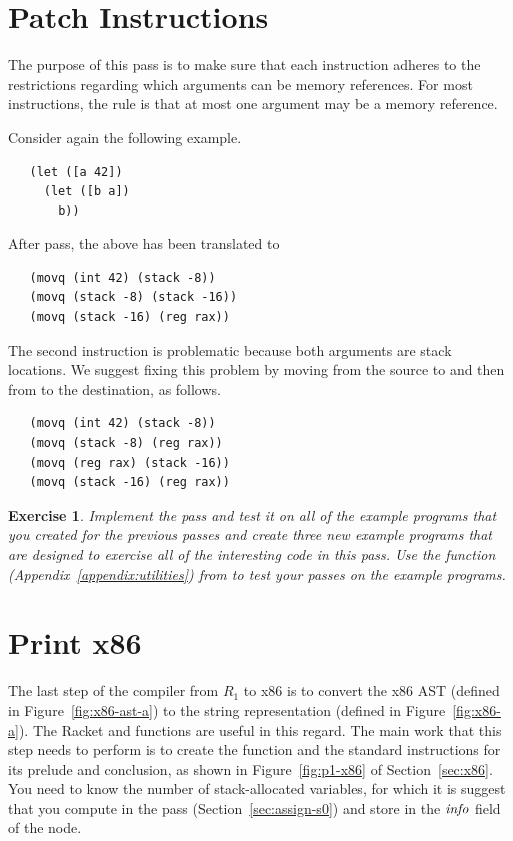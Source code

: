 \documentclass[11pt]{book}
\newtheorem{exercise}[theorem]{Exercise}
\begin{document}
\section{Patch Instructions}
\label{sec:patch-s0}

The purpose of this pass is to make sure that each instruction adheres
to the restrictions regarding which arguments can be memory
references. For most instructions, the rule is that at most one
argument may be a memory reference.

Consider again the following example.
\begin{lstlisting}
   (let ([a 42])
     (let ([b a])
       b))
\end{lstlisting}
After  pass, the above has been translated to
\begin{lstlisting}
   (movq (int 42) (stack -8))
   (movq (stack -8) (stack -16))
   (movq (stack -16) (reg rax))
\end{lstlisting}
The second  instruction is problematic because both arguments
are stack locations. We suggest fixing this problem by moving from the
source to  and then from  to the destination, as
follows.
\begin{lstlisting}
   (movq (int 42) (stack -8))
   (movq (stack -8) (reg rax))
   (movq (reg rax) (stack -16))
   (movq (stack -16) (reg rax))
\end{lstlisting}

\begin{exercise}
\normalfont
Implement the  pass and test it on all of the
example programs that you created for the previous passes and create
three new example programs that are designed to exercise all of the
interesting code in this pass. Use the  function
(Appendix~\ref{appendix:utilities}) from  to test
your passes on the example programs.
\end{exercise}


\section{Print x86}
\label{sec:print-x86}

The last step of the compiler from $R_1$ to x86 is to convert the
x86 AST (defined in Figure~\ref{fig:x86-ast-a}) to the string
representation (defined in Figure~\ref{fig:x86-a}). The Racket
 and  functions are useful in this
regard. The main work that this step needs to perform is to create the
 function and the standard instructions for its prelude
and conclusion, as shown in Figure~\ref{fig:p1-x86} of
Section~\ref{sec:x86}. You need to know the number of
stack-allocated variables, for which it is suggest that you compute in
the  pass (Section~\ref{sec:assign-s0}) and store in
the $\mathit{info}$ field of the  node.
\end{document}
